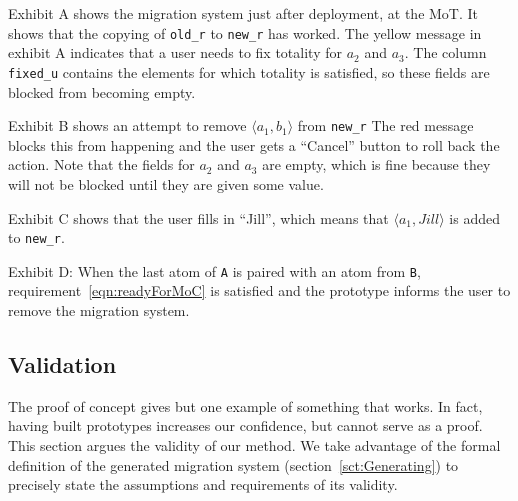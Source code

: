 \documentclass[runningheads]{llncs}
\newcommand{\pair}[2]{\langle{#1},{#2}\rangle}
\begin{document}
   Exhibit A shows the migration system just after deployment, at the MoT.
   It shows that the copying of {\small\verb#old_r#} to {\small\verb#new_r#} has worked.
   The yellow message in exhibit A indicates that a user needs to fix totality for $a_2$ and $a_3$.
   The column {\small\verb#fixed_u#} contains the elements for which totality is satisfied, so these fields are blocked from becoming empty.

   Exhibit B shows an attempt to remove $\pair{a_1}{b_1}$ from {\small\verb#new_r#}
   The red message blocks this from happening and the user gets a ``Cancel'' button to roll back the action.
   Note that the fields for $a_2$ and $a_3$ are empty, which is fine because they will not be blocked until they are given some value.

   Exhibit C shows that the user fills in ``Jill'', which means that $\pair{a_1}{Jill}$ is added to {\small\verb#new_r#}.
   
   Exhibit D: When the last atom of {\tt A} is paired with an atom from {\tt B}, requirement~\ref{eqn:readyForMoC} is satisfied and the prototype informs the user to remove the migration system.

\subsection{Validation}
   The proof of concept gives but one example of something that works.
   In fact, having built prototypes increases our confidence, but cannot serve as a proof.
   This section argues the validity of our method.
   We take advantage of the formal definition of the generated migration system (section~\ref{sct:Generating}) to precisely state the assumptions and requirements of its validity.
\end{document}
